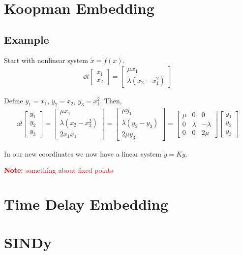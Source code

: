 \documentclass[12pt]{article}
\newcommand{\note}[1]{\textcolor{red}{\textbf{Note:} #1}}
\begin{document}
\section{Koopman Embedding}


\subsection{Example}

Start with nonlinear system \( \dot{x} = f(x) \).
\begin{align*}
    \dd{}{t} \left[\begin{array}{c}x_1 \\ x_2\end{array}\right]
        = 
    \left[\begin{array}{c}\mu x_1 \\ \lambda(x_2-x_1^2) \end{array}\right]
\end{align*}

Define \( y_1 = x_1 \), \( y_2 = x_2 \), \( y_3 = x_1^2 \). Then,
\begin{align*}
    \dd{}{t} \left[\begin{array}{c}y_1 \\ y_2 \\ y_3 \end{array}\right]
        =
    \left[\begin{array}{c} \mu x_1 \\ \lambda (x_2-x_2^2) \\ 2 x_1 \dot{x_1} \end{array}\right]
        =
    \left[\begin{array}{c} \mu y_1 \\ \lambda (y_2 - y_3) \\ 2\mu y_3 \end{array}\right]
        =
    \left[\begin{array}{ccc}\mu & 0 & 0 \\ 0 & \lambda & -\lambda \\ 0 & 0 & 2\mu \end{array}\right]
    \left[\begin{array}{c} y_1 \\ y_2 \\ y_3\end{array}\right]
\end{align*}

In our new coordinates we now have a linear system \( \dot{y} = K y  \). 


\note{something about fixed points}

    

\section{Time Delay Embedding}


\section{SINDy}



{}

\end{document}
